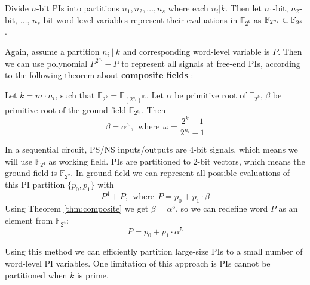 \begin{figure}[tbp]
\end{figure}

\begin{Proposition}
Divide $n$-bit PIs into partitions $n_1,n_2,\dots, n_s$ where each $n_i|k$. Then let $n_1$-bit, $n_2$-bit, $\dots$, $n_s$-bit word-level variables
represent their evaluations in $\mathbb F_{2^k}$ as ${\mathbb{F}}_{2^{n_i}} \subset {\mathbb{F}}_{2^k}$.
\end{Proposition}

Again, assume a partition $n_i~|~k$ and corresponding word-level variable is $P$. Then we can use polynomial
$P^{2^{n_i}}-P$ to represent all signals at free-end PIs, according to the following theorem about {\bf composite
fields} \cite{ecc:software}:
\begin{Theorem}
\label{thm:composite}
Let $k = m\cdot n_i$, such that $\mathbb F_{2^k} = \mathbb F_{(2^{n_i})^m}$. Let $\alpha$ be primitive root of 
$\mathbb F_{2^k}$, $\beta$ be primitive root of the ground field $\mathbb F_{2^{n_i}}$. Then
$$\beta = \alpha^\omega,~~\text{where}~~\omega = \frac{2^k-1}{2^{n_i}-1}$$
\end{Theorem}
\begin{Example}
\label{ex:PI}
In a sequential circuit, PS/NS inputs/outputs are 4-bit signals, which means we will use $\mathbb F_{2^4}$
as working field. PIs are partitioned to 2-bit vectors, which means the ground field is $\mathbb F_{2^2}$.
In ground field we can represent all possible evaluations of this PI partition $\{p_0,p_1\}$ with
$$P^4+P,~~\text{where}~~P=p_0+p_1\cdot\beta$$
Using Theorem \ref{thm:composite} we get $\beta = \alpha^5$, so we can redefine word $P$ as an element from $\mathbb F_{2^4}$:
$$P = p_0 + p_1\cdot\alpha^5$$
\end{Example}
Using this method we can efficiently partition large-size PIs to a small number of word-level PI variables.
One limitation of this approach is PIs cannot be partitioned when $k$ is prime.

